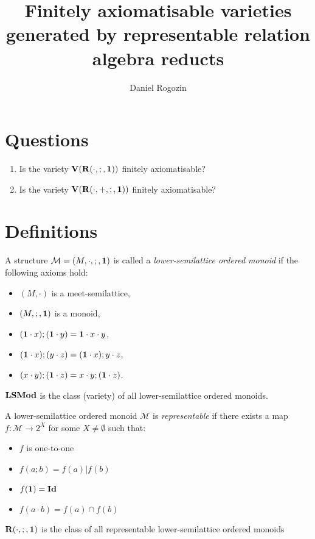 \documentclass[a4paper]{article}
\author{Daniel Rogozin}
\date{}
\title{Finitely axiomatisable varieties generated by representable relation algebra reducts}
\theoremstyle{defin}
\theoremstyle{theorem}
\theoremstyle{claim}
\theoremstyle{prop}
\theoremstyle{lemma}
\theoremstyle{fact}
\theoremstyle{ex}
\theoremstyle{col}
\begin{document}
\maketitle

\nocite{*}

\section{Questions}

\begin{enumerate}
\item Is the variety ${\bf V}({\bf R}(\cdot, ;, {\bf 1}))$ finitely axiomatisable?
\item Is the variety ${\bf V}({\bf R}(\cdot, +, ;, {\bf 1}))$ finitely axiomatisable?
\end{enumerate}

\section{Definitions}

A structure $\mathcal{M} = (M, \cdot, ;, {\bf 1})$ is called a \emph{lower-semilattice ordered monoid} if the following axioms hold:
\begin{itemize}
\item $(M, \cdot)$ is a meet-semilattice,
\item $(M, ;, {\bf 1})$ is a monoid,
\item $({\bf 1} \cdot x) ; ({\bf 1} \cdot y) = {\bf 1} \cdot x \cdot y$,
\item $({\bf 1} \cdot x) ; (y \cdot z) = ({\bf 1} \cdot x) ; y \cdot z$,
\item $(x \cdot y) ; ({\bf 1} \cdot z) = x \cdot y ; ({\bf 1} \cdot z)$.
\end{itemize}
${\bf LSMod}$ is the class (variety) of all lower-semilattice ordered monoids.

A lower-semilattice ordered monoid $\mathcal{M}$ is \emph{representable} if there exists a map $f : \mathcal{M} \to 2^{X}$ for some $X \neq \emptyset$ such that:
\begin{itemize}
\item $f$ is one-to-one
\item $f(a ; b) = f(a) | f(b)$
\item $f({\bf 1}) = {\bf Id}$
\item $f(a \cdot b) = f(a) \cap f(b)$
\end{itemize}
${\bf R}(\cdot, ;, {\bf 1})$ is the class of all representable lower-semilattice ordered monoids
\end{document}
